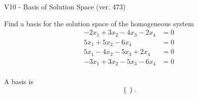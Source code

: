 \begin{exercise}
  \begin{exerciseTitle}V10 - Basis of Solution Space (ver. 473)\end{exerciseTitle}
  \begin{exerciseStatement}
    Find a basis for the solution space of the homogeneous system 
\begin{align*}
 -2 x_ 1 + 3 x_ 2 -4 x_ 3 -2 x_ 4 &= 0  \\ 
  5 x_ 1 + 5 x_ 2 -6 x_ 4 &= 0  \\ 
  5 x_ 1 -4 x_ 2 -5 x_ 3 + 2 x_ 4 &= 0  \\ 
  -3 x_ 1 + 3 x_ 2 -5 x_ 3 -6 x_ 4 &= 0  \\ 
 \end{align*}


 
  \end{exerciseStatement}

  \begin{exerciseAnswer}
   A basis is   
\[\left\{\right\}.\]

  


  \end{exerciseAnswer}
\end{exercise}